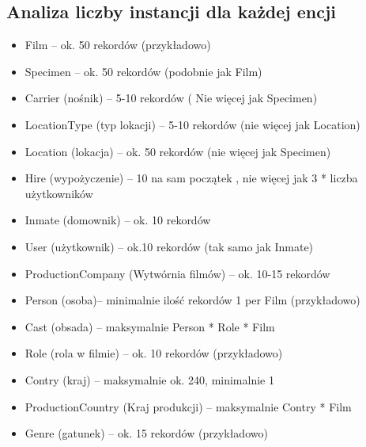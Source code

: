 \documentclass{article}
\begin{document}
\subsection{Analiza liczby instancji dla każdej encji}
\begin{itemize}
\item Film – ok. 50 rekordów (przykładowo)
\item Specimen – ok. 50 rekordów (podobnie jak Film)
\item Carrier (nośnik) – 5-10 rekordów ( Nie więcej jak Specimen)
\item LocationType (typ lokacji) – 5-10 rekordów (nie więcej jak Location)
\item Location (lokacja) – ok. 50 rekordów (nie więcej jak Specimen)
\item Hire (wypożyczenie) – 10 na sam początek , nie więcej jak 3 * liczba użytkowników
\item Inmate (domownik) – ok. 10 rekordów
\item User (użytkownik) – ok.10 rekordów (tak samo jak Inmate)
\item ProductionCompany (Wytwórnia filmów) – ok. 10-15 rekordów
\item Person (osoba)– minimalnie ilość rekordów 1 per Film (przykładowo)
\item Cast (obsada) – maksymalnie Person * Role * Film
\item Role (rola w filmie) – ok. 10 rekordów (przykładowo)
\item Contry (kraj) – maksymalnie ok. 240, minimalnie 1
\item ProductionCountry (Kraj produkcji) – maksymalnie Contry * Film
\item Genre (gatunek) – ok. 15 rekordów (przykładowo)
\end{itemize}
\end{document}
